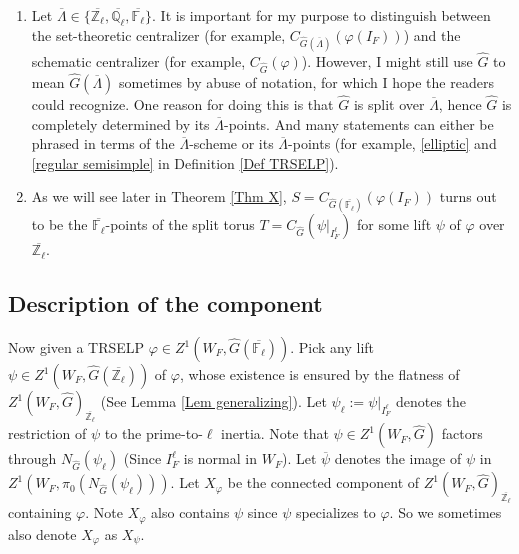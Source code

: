   \begin{remark}
  	\begin{enumerate}
  		\item Let $\overline{\Lambda} \in \{\overline{\mathbb{Z}_{\ell}}, \overline{\mathbb{Q}_{\ell}}, \overline{\mathbb{F}_{\ell}}\}$. It is important for my purpose to distinguish between the set-theoretic centralizer (for example, $C_{\hat{G}(\overline{\Lambda})}(\varphi(I_F))$) and the schematic centralizer (for example, $C_{\hat{G}}(\varphi)$). However, I might still use $\hat{G}$ to mean $\hat{G}(\overline{\Lambda})$ sometimes by abuse of notation, for which I hope the readers could recognize. One reason for doing this is that $\hat{G}$ is split over $\overline{\Lambda}$, hence $\hat{G}$ is completely determined by its $\overline{\Lambda}$-points. And many statements can either be phrased in terms of the $\overline{\Lambda}$-scheme or its $\overline{\Lambda}$-points (for example, \ref{elliptic} and \ref{regular semisimple} in Definition \ref{Def TRSELP}).
  		\item As we will see later in Theorem \ref{Thm X}, $S=C_{\hat{G}(\overline{\mathbb{F}_{\ell}})}(\varphi(I_F))$ turns out to be the $\overline{\mathbb{F}_{\ell}}$-points of the split torus $T=C_{\hat{G}}(\psi|_{I_F^{\ell}})$ for some lift $\psi$ of $\varphi$ over $\overline{\mathbb{Z}_{\ell}}$.
  	\end{enumerate}
  \end{remark}

\subsection{Description of the component}

Now given a TRSELP $\varphi \in Z^1(W_F, \hat{G}(\overline{\mathbb{F}_{\ell}}))$. Pick any lift $\psi \in Z^1(W_F, \hat{G}(\overline{\mathbb{Z}_{\ell}}))$ of $\varphi$, whose existence is ensured by the flatness of $Z^1(W_F, \hat{G})_{\overline{\mathbb{Z}_{\ell}}}$ (See Lemma \ref{Lem generalizing}). Let $\psi_{\ell}:=\psi|_{I_F^{\ell}}$ denotes the restriction of $\psi$ to the prime-to-$\ell$ inertia. Note that $\psi \in Z^1(W_F, \hat{G})$ factors through $N_{\hat{G}}(\psi_{\ell})$ (Since $I_F^{\ell}$ is normal in $W_F$). Let $\overline{\psi}$ denotes the image of $\psi$ in $Z^1(W_F, \pi_0(N_{\hat{G}}(\psi_{\ell})))$. Let $X_{\varphi}$ be the connected component of $Z^1(W_F, \hat{G})_{\overline{\mathbb{Z}_{\ell}}}$ containing $\varphi$. Note $X_{\varphi}$ also contains $\psi$ since $\psi$ specializes to $\varphi$. So we sometimes also denote $X_{\varphi}$ as $X_{\psi}$.

